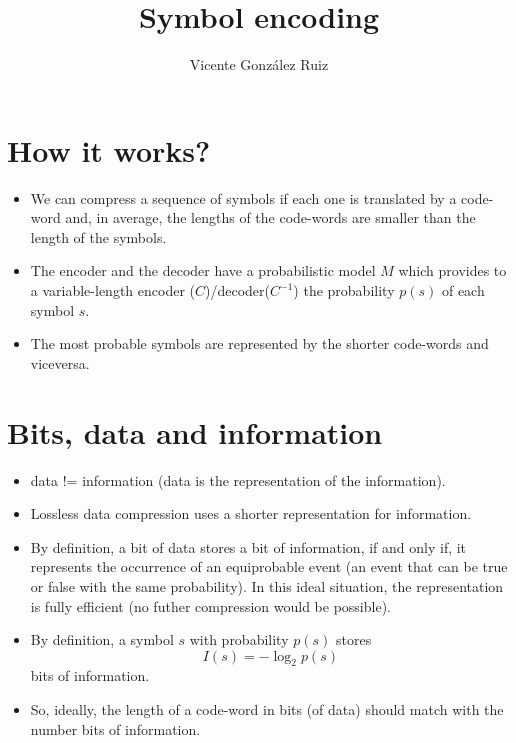 \title{Symbol encoding}
\author{Vicente González Ruiz}
\maketitle
\tableofcontents

\section{How it works?}
\begin{itemize}
\item
  We can compress a sequence of symbols if each one is translated by a
  code-word and, in average, the lengths of the code-words are smaller
  than the length of the symbols.
\item
  The encoder and the decoder have a probabilistic model \(M\) which
  provides to a variable-length encoder (\(C\))/decoder(\(C^{-1}\)) the
  probability \(p(s)\) of each symbol \(s\).
\item
  The most probable symbols are represented by the shorter code-words
  and viceversa.
\end{itemize}


\section{Bits, data and information}
\begin{itemize}
\item
  data != information (data is the representation of the information).
\item
  Lossless data compression uses a shorter representation for
  information.
\item
  By definition, a bit of data stores a bit of information, if and only
  if, it represents the occurrence of an equiprobable event (an event
  that can be true or false with the same probability). In this ideal
  situation, the representation is fully efficient (no futher
  compression would be possible).
\item
  By definition, a symbol \(s\) with probability \(p(s)\) stores
  \begin{equation}
    I(s)=-\log_2 p(s) \label{Eq:symbol_information} \tag{Eq:symbol\_information}
  \end{equation}
  bits of information.
\item
  So, ideally, the length of a code-word in bits (of data) should match
  with the number bits of information.
\end{itemize}

